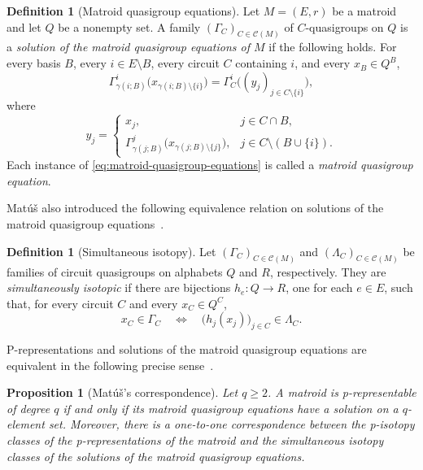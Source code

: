 \documentclass[preprint,12pt]{elsarticle}
\newtheorem{proposition}[theorem]{Proposition}
\theoremstyle{definition}
\newtheorem{definition}[theorem]{Definition}
\begin{document}
\begin{definition}[Matroid quasigroup equations]\label{def:matroid-quasigroup-equations}
	Let $M=(E,r)$ be a matroid and let $Q$ be a nonempty set. A family
	$(\Gamma_C)_{C\in\mathcal C(M)}$ of $C$-quasigroups on $Q$ is a
	\emph{solution of the matroid quasigroup equations of $M$} if the following
	holds. For every basis $B$, every $i\in E\setminus B$, every circuit $C$
	containing $i$, and every $x_B\in Q^B$,
	\begin{equation}\label{eq:matroid-quasigroup-equations}
		\Gamma_{\gamma(i;B)}^i
		\bigl(x_{\gamma(i;B)\setminus\{i\}}\bigr)
		=
		\Gamma_C^i\bigl((y_j)_{j\in C\setminus\{i\}}\bigr),
	\end{equation}
	where
	\[
	y_j=
	\begin{cases}
		x_j,&j\in C\cap B,\\
		\Gamma_{\gamma(j;B)}^j
		\bigl(x_{\gamma(j;B)\setminus\{j\}}\bigr),
		&j\in C\setminus(B\cup\{i\}).
	\end{cases}
	\]
	Each instance of \eqref{eq:matroid-quasigroup-equations} is called a
	\emph{matroid quasigroup equation}.
\end{definition}

Mat\'u\v{s} also introduced the following equivalence relation on solutions of the matroid quasigroup equations~\cite[Definition~2.3]{Matus1999}.

\begin{definition}[Simultaneous isotopy]\label{def:simultaneous-isotopy}
	Let $(\Gamma_C)_{C\in\mathcal C(M)}$ and
	$(\Lambda_C)_{C\in\mathcal C(M)}$ be families of circuit quasigroups on
	alphabets $Q$ and $R$, respectively. They are \emph{simultaneously isotopic}
	if there are bijections $h_e:Q\to R$, one for each $e\in E$, such that, for
	every circuit $C$ and every $x_C\in Q^C$,
	\[
	x_C\in\Gamma_C
	\quad\Longleftrightarrow\quad
	\bigl(h_j(x_j)\bigr)_{j\in C}\in\Lambda_C.
	\]
\end{definition}

P-representations and solutions of the matroid quasigroup equations are equivalent in the following precise sense~\cite[Proposition~2.4]{Matus1999}.

\begin{proposition}[Mat\'u\v{s}'s correspondence]\label{prop:matus-correspondence}
	Let $q\ge2$. A matroid is p-representable of degree $q$ if and only
	if its matroid quasigroup equations have a solution on a $q$-element
	set. Moreover, there is a one-to-one correspondence between the p-isotopy
	classes of the p-representations of the matroid and the simultaneous 
	isotopy classes of the solutions of the matroid quasigroup equations.
\end{proposition}
\end{document}
